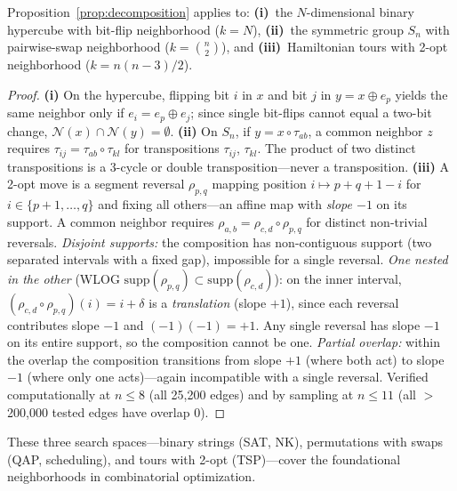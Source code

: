 \documentclass[runningheads]{llncs}
\begin{document}
\begin{corollary}
\label{cor:search_spaces}
Proposition~\ref{prop:decomposition} applies to:
\textbf{(i)}~the $N$-dimensional binary hypercube with bit-flip neighborhood ($k = N$),
\textbf{(ii)}~the symmetric group $S_n$ with pairwise-swap neighborhood ($k = \binom{n}{2}$), and
\textbf{(iii)}~Hamiltonian tours with 2-opt neighborhood ($k = n(n\!-\!3)/2$).
\end{corollary}

\begin{proof}
\textbf{(i)} On the hypercube, flipping bit $i$ in $x$ and bit $j$ in $y = x \oplus e_p$ yields the same neighbor only if $e_i = e_p \oplus e_j$; since single bit-flips cannot equal a two-bit change, $\mathcal{N}(x) \cap \mathcal{N}(y) = \emptyset$.
\textbf{(ii)} On $S_n$, if $y = x \circ \tau_{ab}$, a common neighbor $z$ requires $\tau_{ij} = \tau_{ab} \circ \tau_{kl}$ for transpositions $\tau_{ij}$, $\tau_{kl}$.
The product of two distinct transpositions is a 3-cycle or double transposition---never a transposition.
\textbf{(iii)} A 2-opt move is a segment reversal $\rho_{p,q}$ mapping position $i \mapsto p\!+\!q\!+\!1\!-\!i$ for $i \in \{p\!+\!1,\dots,q\}$ and fixing all others---an affine map with \emph{slope $-1$} on its support.
A common neighbor requires $\rho_{a,b} = \rho_{c,d} \circ \rho_{p,q}$ for distinct non-trivial reversals.
\emph{Disjoint supports:} the composition has non-contiguous support (two separated intervals with a fixed gap), impossible for a single reversal.
\emph{One nested in the other} (WLOG $\mathrm{supp}(\rho_{p,q}) \subset \mathrm{supp}(\rho_{c,d})$): on the inner interval, $(\rho_{c,d} \circ \rho_{p,q})(i) = i + \delta$ is a \emph{translation} (slope $+1$), since each reversal contributes slope $-1$ and $(-1)(-1) = +1$.
Any single reversal has slope $-1$ on its entire support, so the composition cannot be one.
\emph{Partial overlap:} within the overlap the composition transitions from slope $+1$ (where both act) to slope $-1$ (where only one acts)---again incompatible with a single reversal.
Verified computationally at $n \le 8$ (all 25{,}200 edges) and by sampling at $n \le 11$ (all $>$200{,}000 tested edges have overlap 0).
\end{proof}

These three search spaces---binary strings (SAT, NK), permutations with swaps (QAP, scheduling), and tours with 2-opt (TSP)---cover the foundational neighborhoods in combinatorial optimization.
\end{document}
